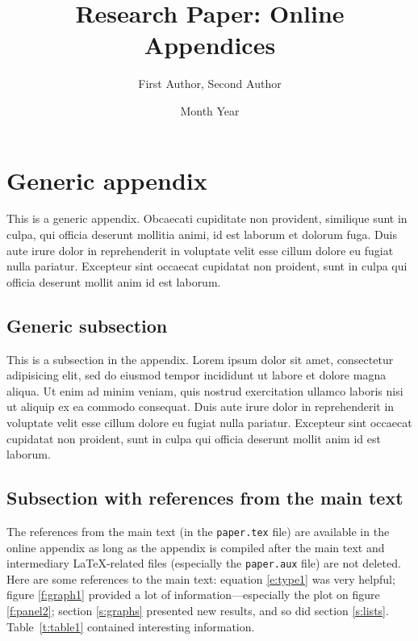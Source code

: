 \documentclass[letterpaper,11pt,leqno]{article}
\begin{document}
\title{Research Paper: Online Appendices}

\author{First Author, Second Author}

\date{Month Year}


\begin{titlepage}
\maketitle
\tableofcontents
\end{titlepage}

\section{Generic appendix}\label{a:appendix1}

This is a generic appendix. Obcaecati cupiditate non provident, similique sunt in culpa, qui officia deserunt mollitia animi, id est laborum et dolorum fuga. Duis aute irure dolor in reprehenderit in voluptate velit esse cillum dolore eu fugiat nulla pariatur. Excepteur sint occaecat cupidatat non proident, sunt in culpa qui officia deserunt mollit anim id est laborum. 

\subsection{Generic subsection} 

This is a subsection in the appendix. Lorem ipsum dolor sit amet, consectetur adipisicing elit, sed do eiusmod tempor incididunt ut labore et dolore magna aliqua. Ut enim ad minim veniam, quis nostrud exercitation ullamco laboris nisi ut aliquip ex ea commodo
consequat. Duis aute irure dolor in reprehenderit in voluptate velit esse
cillum dolore eu fugiat nulla pariatur. Excepteur sint occaecat cupidatat non
proident, sunt in culpa qui officia deserunt mollit anim id est laborum. 

\subsection{Subsection with references from the main text} 

The references from the main text (in the \texttt{paper.tex} file) are available in the online appendix as long as the appendix is compiled after the main text and intermediary LaTeX-related files (especially the \texttt{paper.aux} file) are not deleted. Here are some references to the main text: equation \ref{e:type1} was very helpful; figure \ref{f:graph1} provided a lot of information---especially the plot on figure \ref{f:panel2}; section \ref{s:graphs} presented new results, and so did section \ref{s:lists}. Table~\ref{t:table1} contained interesting information.
\end{document}
